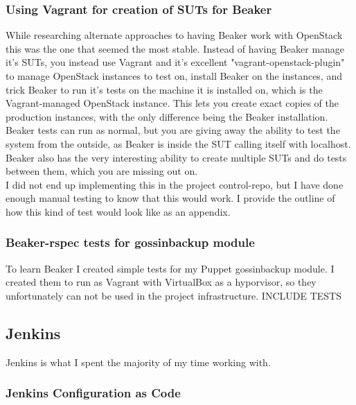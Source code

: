 \subsubsection{Using Vagrant for creation of SUTs for Beaker}

While researching alternate approaches to having Beaker work with OpenStack this was the one that seemed the most stable. Instead of having Beaker manage it's SUTs, you instead use Vagrant and it's excellent "vagrant-openstack-plugin" to manage OpenStack instances to test on, install Beaker on the instances, and trick Beaker to run it's tests on the machine it is installed on, which is the Vagrant-managed OpenStack instance. This lets you create exact copies of the production instances, with the only difference being the Beaker installation. Beaker tests can run as normal, but you are giving away the ability to test the system from the outside, as Beaker is inside the SUT calling itself with localhost. Beaker also has the very interesting ability to create multiple SUTs and do tests between them, which you are missing out on.
\\
I did not end up implementing this in the project control-repo, but I have done enough manual testing to know that this would work. I provide the outline of how this kind of test would look like as an appendix.


\subsubsection{Beaker-rspec tests for gossinbackup module}

To learn Beaker I created simple tests for my Puppet gossinbackup module. I created them to run as Vagrant with VirtualBox as a hyporvisor, so they unfortunately can not be used in the project infrastructure. INCLUDE TESTS


\subsection{Jenkins}

Jenkins is what I spent the majority of my time working with.

\subsubsection{Jenkins Configuration as Code}


